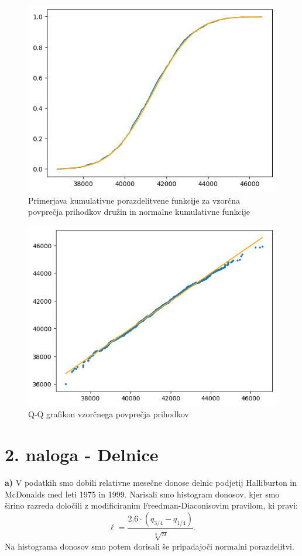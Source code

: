 \documentclass[a4paper,11pt]{article}
\begin{document}
\begin{figure}[H]
    \centering
    \includegraphics[scale = 0.45]{slike1/1_7.png}
    \caption{Primerjava kumulativne porazdelitvene funkcije za vzorčna povprečja prihodkov družin in normalne kumulativne funkcije}
\end{figure}

\begin{figure}[H]
    \centering
    \includegraphics[scale = 0.45]{slike1/1_8.png}
    \caption{Q-Q grafikon vzorčnega povprečja prihodkov}
\end{figure}


\section*{2. naloga - Delnice}
\noindent
\textbf{a)} V podatkih smo dobili relativne mesečne donose delnic podjetij Halliburton in McDonalds med leti 1975 in 1999. Narisali smo histogram donosov, kjer smo širino razreda določili z modificiranim Freedman-Diaconisovim pravilom, ki pravi: 
\[
    \ell = \frac{2.6\cdot(q_{3/4}-q_{1/4})}{\sqrt[3]{n}}.
\]
Na histograma donosov smo potem dorisali še pripadajoči normalni porazdelitvi.
\end{document}
